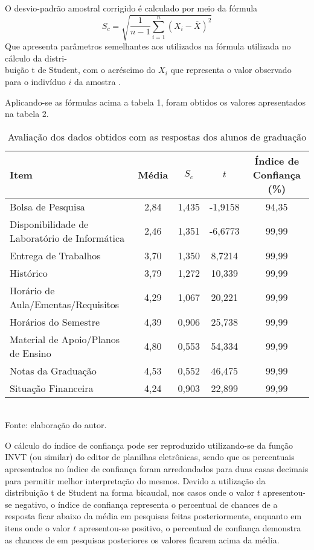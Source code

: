 O desvio-padrão amostral corrigido é calculado por meio da fórmula 
\[
   S_c = \sqrt{\frac{1}{n-1} \sum_{i=1}^n(X_i - \overline{X})^2} 
\]
Que apresenta parâmetros semelhantes aos utilizados na fórmula utilizada no cálculo da distri- \\ buição t de Student, com o acréscimo do $X_i$ que representa o valor observado para o indivíduo $i$ da amostra
\cite{DistroStudent}.

Aplicando-se as fórmulas acima a tabela 1, foram obtidos os valores apresentados na tabela 2.

\begin{table}[!hbt]
\centering
\caption[Avaliação dos dados obtidos - Graduação]{Avaliação dos dados obtidos com as respostas dos alunos de graduação}
\vspace{3mm}
\begin{tabular}{p{5cm}|c|c|c|c}\hline
\textbf{Item} & \textbf{Média} & \textbf{$S_c$} & \textbf{$t$} & \textbf{Índice de Confiança (\%)} \\ \hline
Bolsa de Pesquisa & 2,84 & 1,435 & -1,9158 & 94,35 \\ \hline
Disponibilidade de Laboratório de Informática & 2,46 & 1,351 & -6,6773 & 99,99 \\ \hline
Entrega de Trabalhos & 3,70 & 1,350 & 8,7214 & 99,99 \\ \hline
Histórico & 3,79 & 1,272 & 10,339 & 99,99 \\ \hline
Horário de Aula/Ementas/Requisitos & 4,29 & 1,067 & 20,221 & 99,99  \\ \hline
Horários do Semestre & 4,39 & 0,906 & 25,738 & 99,99 \\ \hline
Material de Apoio/Planos de Ensino & 4,80 & 0,553 & 54,334 & 99,99 \\ \hline
Notas da Graduação & 4,53 & 0,552 & 46,475 & 99,99 \\ \hline
Situação Financeira & 4,24 & 0,903 & 22,899 & 99,99 \\ \hline
\end{tabular}
\\ Fonte: elaboração do autor.
\end{table}

O cálculo do índice de confiança pode ser reproduzido utilizando-se da função INVT (ou similar) do editor de planilhas eletrônicas, sendo que os percentuais apresentados no índice de confiança foram arredondados para duas casas decimais para permitir melhor interpretação do mesmos. 
Devido a utilização da  distribuição t de Student na forma bicaudal, nos casos onde o valor $t$ apresentou-se negativo, o índice de confiança representa o percentual de chances de a resposta ficar abaixo da média em pesquisas feitas posteriormente, enquanto em itens onde o valor $t$ apresentou-se positivo, o percentual de confiança demonstra as chances de em pesquisas posteriores os valores ficarem acima da média.

